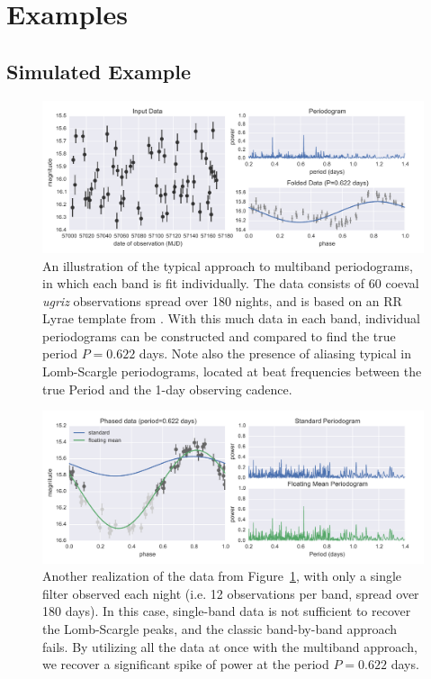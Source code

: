 \documentclass[12pt,preprint]{aastex}
\newcommand{\Fig}[1]{Figure~\ref{fig:#1}}
\newcommand{\fig}[1]{\Fig{#1}}
\newcommand{\figlabel}[1]{\label{fig:#1}}
\begin{document}
\section{Examples}
\subsection{Simulated Example}

\begin{figure}
  \centering
  \includegraphics[width=\textwidth]{fig01.pdf}
  \caption{
    An illustration of the typical approach to multiband periodograms,
    in which each band is fit individually. The data consists of 60 coeval
    {\it ugriz} observations spread over 180 nights, and is based on an
    RR Lyrae template from \citet{Sesar2010}. With this much data in each
    band, individual periodograms can be constructed and compared to find the
    true period $P=0.622$ days. Note also the presence of aliasing typical
    in Lomb-Scargle periodograms, located at beat frequencies between the
    true Period and the 1-day observing cadence.
  }
  \figlabel{01}
\end{figure}

\begin{figure}
  \centering
  \includegraphics[width=\textwidth]{fig02.pdf}
  \caption{
    Another realization of the data from \fig{01}, with only a single filter
    observed each night (i.e. 12 observations per band, spread over 180
    days). In this case, single-band data is not sufficient to recover the
    Lomb-Scargle peaks, and the classic band-by-band approach fails.
    By utilizing all the data at once with the multiband approach,
    we recover a significant spike of power at the period $P=0.622$ days.    
  } 
  \figlabel{02}
\end{figure}
\end{document}

